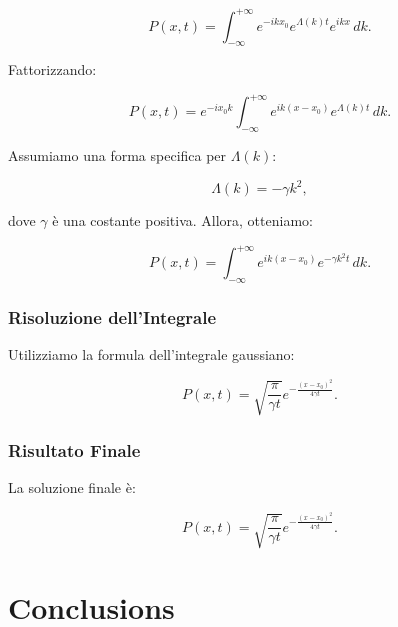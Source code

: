 \documentclass[Lau,binding=0.6cm,oneside,noexaminfo]{sapthesis}
\begin{document}
\[
P(x, t) = \int_{-\infty}^{+\infty} e^{-ikx_0} e^{\Lambda(k) t} e^{ikx} \, dk.
\]

Fattorizzando:

\[
P(x, t) = e^{-ix_0 k} \int_{-\infty}^{+\infty} e^{ik(x - x_0)} e^{\Lambda(k) t} \, dk.
\]

Assumiamo una forma specifica per \( \Lambda(k) \):

\[
\Lambda(k) = -\gamma k^2,
\]

dove \( \gamma \) è una costante positiva. Allora, otteniamo:

\[
P(x, t) = \int_{-\infty}^{+\infty} e^{ik(x - x_0)} e^{-\gamma k^2 t} \, dk.
\]

\subsection*{Risoluzione dell'Integrale}

Utilizziamo la formula dell'integrale gaussiano:

\[
P(x, t) = \sqrt{\frac{\pi}{\gamma t}} e^{-\frac{(x - x_0)^2}{4\gamma t}}.
\]

\subsection*{Risultato Finale}

La soluzione finale è:

\[
P(x, t) = \sqrt{\frac{\pi}{\gamma t}} e^{-\frac{(x - x_0)^2}{4\gamma t}}.
\]
\chapter{Conclusions}

\newpage
\null
\thispagestyle{empty}
\newpage
{}

\begin{thebibliography}{50}
\end{thebibliography}

\end{document}
